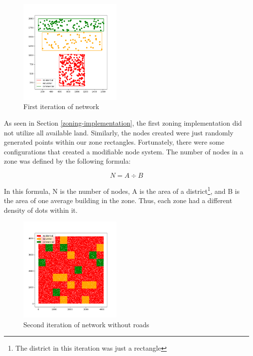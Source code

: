 \documentclass[11pt]{article}
\begin{document}
\begin{multicols}{2}
    \begin{figure}[H]
        \centering
        \vspace{-1em}
        \includegraphics[width=0.45\textwidth]{images/firstzoningwnodes.png}
        \caption{First iteration of network}
        \label{fig:first-network}
    \end{figure}

    \quad As seen in Section \ref{zoning-implementation}, the first zoning implementation did not utilize all available land. Similarly, the nodes created were just randomly generated points within our zone rectangles. Fortunately, there were some configurations that created a modifiable node system. The number of nodes in a zone was defined by the following formula:

    \[N = A \div B\]

    In this formula, N is the number of nodes, A is the area of a district\footnote{The district in this iteration was just a rectangle}, and B is the area of one average building in the zone. Thus, each zone had a different density of dots within it.

    \begin{figure}[H]
        \centering
        \vspace{-1em}
        \includegraphics[width=0.45\textwidth]{images/secondzoningwnodes.png}
        \caption{Second iteration of network without roads}
        \label{fig:second-nodes}
    \end{figure}


\end{multicols}
\end{document}
